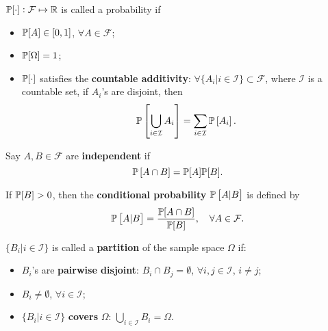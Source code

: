 \begin{definition}[Probability]
    $\mathbb{P}[\cdot]: \mathcal{F} \mapsto \mathbb{R}$ is called a probability if
    \begin{itemize}
        \item $\mathbb{P}[A] \in [0,1]$, $\forall A \in \mathcal{F}$;
        \item $\mathbb{P}[\Omega] = 1$;
        \item $\mathbb{P}[\cdot]$ satisfies the \textbf{countable additivity}: $\forall \{A_i | i \in \mathcal{I} \} \subset \mathcal{F}$, where $\mathcal{I}$ is a countable set, if $A_i$'s are disjoint, then 
        \begin{equation*}
            \mathbb{P} \left[ \bigcup_{i \in \mathcal{I}} A_i \right] = \sum_{i \in \mathcal{I}} \mathbb{P} \left[A_i\right].
        \end{equation*}
    \end{itemize}
\end{definition}

\begin{definition}[Independence]
    Say $A, B \in \mathcal{F}$ are \textbf{independent} if
    \begin{equation*}
        \mathbb{P} \left[ A \cap B \right] = \mathbb{P} [A] \mathbb{P} [B].
    \end{equation*}
\end{definition}

\begin{definition}
    If $\mathbb{P} [B] > 0$, then the \textbf{conditional probability} $\mathbb{P} \left[ A | B \right]$ is defined by 
    \begin{equation*}
        \mathbb{P} \left[ A | B \right] = \frac{\mathbb{P} [A \cap B]}{\mathbb{P} [B]}, \quad \forall A \in \mathcal{F}.
    \end{equation*}
\end{definition}

\begin{definition}[Partitions]
    $\{ B_i | i \in \mathcal{I} \}$ is called a \textbf{partition} of the sample space $\Omega$ if:
    \begin{itemize}
        \item $B_i$'s are \textbf{pairwise disjoint}: $B_i \cap B_j = \emptyset$, $\forall i, j \in \mathcal{I}$, $i \neq j$;
        \item $B_i \neq \emptyset$, $\forall i \in \mathcal{I}$;
        \item $\{ B_i | i \in \mathcal{I} \}$ \textbf{covers} $\Omega$: $\bigcup_{i\in \mathcal{I}} B_i = \Omega$.
    \end{itemize}
\end{definition}

